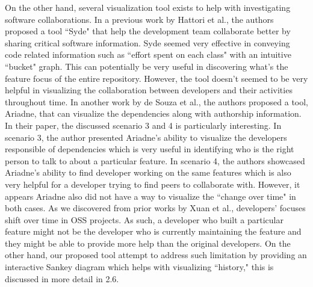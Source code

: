 \documentclass{article}
\begin{document}
On the other hand, several visualization tool exists to help with investigating software collaborations. In a previous work by Hattori et al.\citep{hattori2010syde}, the authors proposed a tool ``Syde" that help the development team collaborate better by sharing critical software information. Syde seemed very effective in conveying code related information such as ``effort spent on each class"\citep{hattori2010syde} with an intuitive ``bucket" graph. This can potentially be very useful in discovering what's the feature focus of the entire repository. However, the tool doesn't seemed to be very helpful in visualizing the collaboration between developers and their activities throughout time. In another work by de Souza et al.\citep{de2007supporting}, the authors proposed a tool, Ariadne, that can visualize the dependencies along with authorship information. In their paper, the discussed scenario 3 and 4 is particularly interesting. In scenario 3, the author presented Ariadne's ability to visualize the developers responsible of dependencies which is very useful in identifying who is the right person to talk to about a particular feature\citep{de2007supporting}. In scenario 4, the authors showcased Ariadne's ability to find developer working on the same features which is also very helpful for a developer trying to find peers to collaborate with. However, it appears Ariadne also did not have a way to visualize the ``change over time" in both cases. As we discovered from prior works by Xuan et al.\citep{xuan2014focus}, developers' focuses shift over time in OSS projects. As such, a developer who built a particular feature might not be the developer who is currently maintaining the feature and they might be able to provide more help than the original developers. On the other hand, our proposed tool attempt to address such limitation by providing an interactive Sankey diagram which helps with visualizing ``history," this is discussed in more detail in 2.6.
\end{document}
